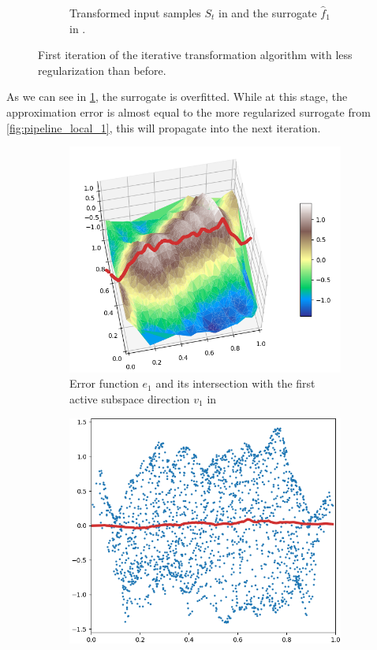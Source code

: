 \documentclass[
  a4paper,  %
  twoside,  %
  bibliography=totoc,
  headsepline,
  cleardoublepage=empty,
  parskip=half,
  draft=false
]{scrbook}
\begin{document}
\begin{mdframed}[style=style]
\begin{figure}[H]
\begin{subfigure}{.5\textwidth}
  \caption{Transformed input samples $S_t$ in \darkblue and the surrogate $\hat{f}_1$ in \red.}
\label{fig:pipeline_bad_local_1}
\end{subfigure}
\delimit
\caption{First iteration of the iterative transformation algorithm with less regularization than before.}
\label{fig:pipeline_bad_1}
\end{figure}
\end{mdframed}
%
As we can see in \cref{fig:pipeline_bad_local_1}, the surrogate is overfitted.
While at this stage, the approximation error is almost equal to the more regularized surrogate from \cref{fig:pipeline_local_1}, this will propagate into the next iteration.

\begin{mdframed}[style=style]
\begin{figure}[H]
\begin{subfigure}{.5\textwidth}
  \centering
  \includegraphics[width=.85\linewidth]{graphics/pipeline_bad_current_2.png}
  \caption{Error function $e_1$ and its intersection with the first active subspace direction $v_1$ in \reddot}
\label{fig:pipeline_bad_current_2}
\end{subfigure}%
\begin{subfigure}{.5\textwidth}
  \centering
  \includegraphics[width=.85\linewidth]{graphics/pipeline_bad_local_2.png}

\end{subfigure}
\end{figure}
\end{mdframed}
\end{document}
